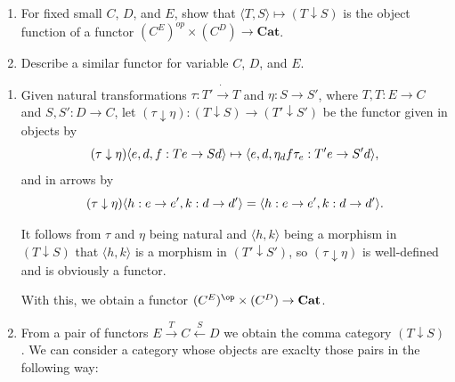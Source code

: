 \begin{exercise}
\begin{enumerate}
\item[(a)] For fixed small $C$, $D$, and $E$, show that $\langle T,S\rangle\mapsto(T\downarrow S)$ is the object function of a functor $(C^E)^{op}\times (C^D)\to\mathbf{Cat}$.
\item[(b)] Describe a similar functor for variable $C$, $D$, and $E$.
\end{enumerate}
\end{exercise}
\begin{solution}
\begin{enumerate}
\item[(a)] Given natural transformations $\tau:T'\dot{\to}T$ and $\eta:S\to S'$, where $T,T:E\to C$ and $S,S':D\to C$, let $(\tau\downarrow\eta):(T\downarrow S)\to(T'\downarrow S')$ be the functor given in objects by
\vspace{-5pt}\[(\tau\downarrow\eta)\langle e,d,f:Te\to Sd\rangle\mapsto\langle e,d,\eta_d f\tau_e:T'e\to S'd\rangle,\vspace{-5pt}\]
and in arrows by
\vspace{-5pt}\[(\tau\downarrow\eta)\langle h:e\to e',k:d\to d'\rangle=\langle h:e\to e',k:d\to d'\rangle.\vspace{-5pt}\]

It follows from $\tau$ and $\eta$ being natural and $\langle h,k\rangle$ being a morphism in $(T\downarrow S)$ that $\langle h,k\rangle$ is a morphism in $(T'\downarrow S')$, so $(\tau\downarrow\eta)$ is well-defined and is obviously a functor.

With this, we obtain a functor $(C^E)^{\op}\times (C^D)\to\mathbf{Cat}$.
\item[(b)] From a pair of functors $E\overset{T}{\to}C\overset{S}{\leftarrow}D$ we obtain the comma category $(T\downarrow S)$. We can consider a category whose objects are exaclty those pairs in the following way:


\end{enumerate}
\end{solution}
